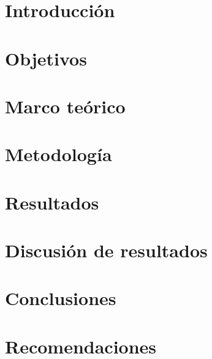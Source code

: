 \documentclass[11pt,letterpaper,oneside]{report}
\begin{document}
\setcounter{page}{1}

\chapter{Introducción}
\label{sec:introduccion}


\chapter{Objetivos}
\label{sec:objetivos}


\chapter{Marco teórico}
\label{sec:marco}


\chapter{Metodología}
\label{sec:metodologia}


\chapter{Resultados}
\label{sec:resultados}

\chapter{Discusión de resultados}
\label{sec:discusiónderesultados}

\chapter{Conclusiones}
\label{sec:conclusiones}

\chapter{Recomendaciones}
\label{sec:recomendaciones}

\nocite{*}


\end{document}
